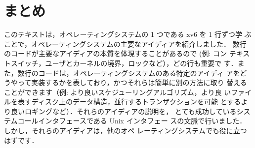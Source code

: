 \chapter{まとめ}
\label{CH:SUM}

このテキストは，オペレーティングシステムの 1 つである xv6 を 1 行ずつ学
ぶことで，オペレーティングシステムの主要なアイディアを紹介しました．
数行のコードが主要なアイディアの本質を体現することがあるので (例: コン
テキストスイッチ，ユーザとカーネルの境界，ロックなど），どの行も重要で
す．また，数行のコードは，オペレーティングシステムのある特定のアイディ
アをどうやって実装するかを表しており，かつそれらは簡単に別の方法に取り
替えることができます（例: より良いスケジューリングアルゴリズム，より良
いファイルを表すディスク上のデータ構造，並行するトランザクションを可能
とするより良いロギングなど）．それらのアイディアの説明を，
とても成功しているシステムコールインタフェースである Unix インタフェー
スの文脈で行いました．しかし，それらのアイディアは，他のオペ
レーティングシステムでも役に立つはずです．

